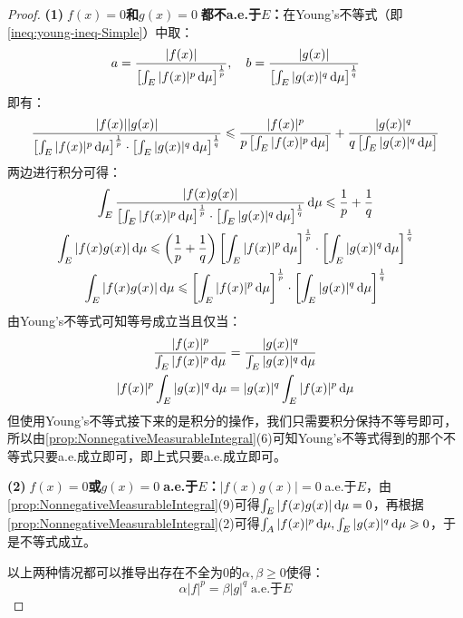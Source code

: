 \begin{proof}
	\textbf{(1)$\;f(x)=0$和$g(x)=0\;$都不a.e.于$E$：}在Young's不等式（即\cref{ineq:young-ineq-Simple}）中取：
	\begin{equation*}
		a=\frac{|f(x)|}{\left[\int_{E}^{}|f(x)|^p\mathop{}\!\mathrm{d}\mu\right]^\frac{1}{p}},\quad
		b=\frac{|g(x)|}{\left[\int_{E}^{}|g(x)|^q\mathop{}\!\mathrm{d}\mu\right]^\frac{1}{q}}
	\end{equation*}
	即有：
	\begin{equation*}
		\frac{|f(x)||g(x)|}{\left[\int_{E}^{}|f(x)|^p\mathop{}\!\mathrm{d}\mu\right]^\frac{1}{p}\cdot\left[\int_{E}^{}|g(x)|^q\mathop{}\!\mathrm{d}\mu\right]^\frac{1}{q}}
		\leqslant\frac{|f(x)|^p}{p\left[\int_{E}^{}|f(x)|^p\mathop{}\!\mathrm{d}\mu\right]}+\frac{|g(x)|^q}{q\left[\int_{E}^{}|g(x)|^q\mathop{}\!\mathrm{d}\mu\right]}
	\end{equation*}
	两边进行积分可得：
	\begin{gather*}
		\int_{E}\frac{|f(x)g(x)|}{\left[\int_{E}^{}|f(x)|^p\dif\mu\right]^\frac{1}{p}\cdot\left[\int_{E}^{}|g(x)|^q\dif\mu\right]^\frac{1}{q}}\dif\mu\leqslant\frac{1}{p}+\frac{1}{q} \\
		\int_{E}|f(x)g(x)|\dif\mu\leqslant\left(\frac{1}{p}+\frac{1}{q}\right)\left[\int_{E}^{}|f(x)|^p\dif\mu\right]^\frac{1}{p}\cdot\left[\int_{E}^{}|g(x)|^q\dif\mu\right]^\frac{1}{q} \\
		\int_{E}|f(x)g(x)|\dif\mu\leqslant\left[\int_{E}^{}|f(x)|^p\dif\mu\right]^\frac{1}{p}\cdot\left[\int_{E}^{}|g(x)|^q\dif\mu\right]^\frac{1}{q}
	\end{gather*}
	由Young's不等式可知等号成立当且仅当：
	\begin{gather*}
		\frac{|f(x)|^p}{\int_{E}^{}|f(x)|^p\mathop{}\!\mathrm{d}\mu}=\frac{|g(x)|^q}{\int_{E}^{}|g(x)|^q\mathop{}\!\mathrm{d}\mu} \\
		|f(x)|^p\int_{E}^{}|g(x)|^q\mathop{}\!\mathrm{d}\mu=|g(x)|^q\int_{E}^{}|f(x)|^p\mathop{}\!\mathrm{d}\mu
	\end{gather*}
	但使用Young's不等式接下来的是积分的操作，我们只需要积分保持不等号即可，所以由\cref{prop:NonnegativeMeasurableIntegral}(6)可知Young's不等式得到的那个不等式只要a.e.成立即可，即上式只要a.e.成立即可。\par
	\textbf{(2)$\;f(x)=0$或$g(x)=0\;$a.e.于$E$：}$|f(x)g(x)|=0\;$a.e.于$E$，由\cref{prop:NonnegativeMeasurableIntegral}(9)可得$\int_{E}|f(x)g(x)|\mathop{}\!\mathrm{d}\mu=0$，再根据\cref{prop:NonnegativeMeasurableIntegral}(2)可得$\int_{A}|f(x)|^p\mathop{}\!\mathrm{d}\mu,\int_{E}|g(x)|^q\mathop{}\!\mathrm{d}\mu\geqslant0$，于是不等式成立。\par
	以上两种情况都可以推导出存在不全为$0$的$\alpha,\beta\geqslant0$使得：
	\begin{equation*}
		\alpha|f|^p=\beta|g|^q\;\text{a.e.于$E$}

\end{equation*}
\end{proof}
